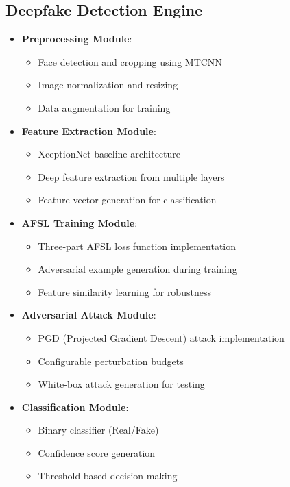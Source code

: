 \documentclass[a4paper,12pt]{article}
\begin{document}
\subsection{Deepfake Detection Engine}
\begin{itemize}
    \item \textbf{Preprocessing Module}: 
    \begin{itemize}
        \item Face detection and cropping using MTCNN
        \item Image normalization and resizing
        \item Data augmentation for training
    \end{itemize}
    
    \item \textbf{Feature Extraction Module}: 
    \begin{itemize}
        \item XceptionNet baseline architecture
        \item Deep feature extraction from multiple layers
        \item Feature vector generation for classification
    \end{itemize}
    
    \item \textbf{AFSL Training Module}: 
    \begin{itemize}
        \item Three-part AFSL loss function implementation
        \item Adversarial example generation during training
        \item Feature similarity learning for robustness
    \end{itemize}
    
    \item \textbf{Adversarial Attack Module}: 
    \begin{itemize}
        \item PGD (Projected Gradient Descent) attack implementation
        \item Configurable perturbation budgets
        \item White-box attack generation for testing
    \end{itemize}
    
    \item \textbf{Classification Module}: 
    \begin{itemize}
        \item Binary classifier (Real/Fake)
        \item Confidence score generation
        \item Threshold-based decision making
    \end{itemize}
    

\end{itemize}
\end{document}
